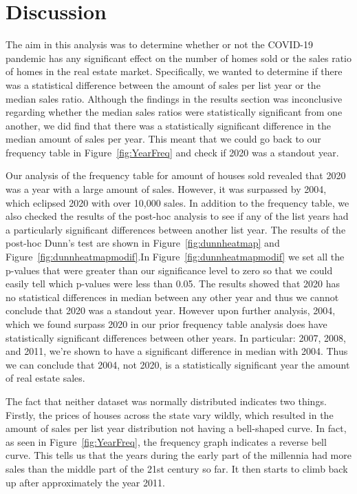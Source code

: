 \documentclass[12pt]{article}
\begin{document}
\section{Discussion}
\label{sec:disc}

The aim in this analysis was to determine whether or not the COVID-19 pandemic has any significant effect on the number of homes sold or the sales ratio of homes in the real estate market. Specifically, we wanted to determine if there was a statistical difference between the amount of sales per list year or the median sales ratio. Although the findings in the results section was inconclusive regarding whether the median sales ratios were statistically significant from one another, we did find that there was a statistically significant difference in the median amount of sales per year. This meant that we could go back to our frequency table in Figure~\ref{fig:YearFreq} and check if 2020 was a standout year.

Our analysis of the frequency table for amount of houses sold revealed that 2020 was a year with a large amount of sales. However, it was surpassed by 2004, which eclipsed 2020 with over 10,000 sales. In addition to the frequency table, we also checked the results of the post-hoc analysis to see if any of the list years had a particularly significant differences between another list year. The results of the post-hoc Dunn's test are shown in Figure~\ref{fig:dunnheatmap} and Figure~\ref{fig:dunnheatmapmodif}.In Figure~\ref{fig:dunnheatmapmodif} we set all the p-values that were greater than our significance level to zero so that we could easily tell which p-values were less than 0.05. The results showed that 2020 has no statistical differences in median between any other year and thus we cannot conclude that 2020 was a standout year. However upon further analysis, 2004, which we found surpass 2020 in our prior frequency table analysis does have statistically significant differences between other years. In particular: 2007, 2008, and 2011, we're shown to have a significant difference in median with 2004. Thus we can conclude that 2004, not 2020, is a statistically significant year the amount of real estate sales.

The fact that neither dataset was normally distributed indicates two things. Firstly, the prices of houses across the state vary wildly, which resulted in the amount of sales per list year distribution not having a bell-shaped curve. In fact, as seen in Figure~\ref{fig:YearFreq}, the frequency graph indicates a reverse bell curve. This tells us that the years during the early part of the millennia had more sales than the middle part of the 21st century so far. It then starts to climb back up after approximately the year 2011.
\end{document}
